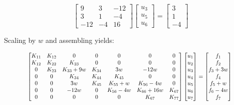 \begin{equation}
    \begin{bmatrix}
        9 & 3 & -12 \\
        3 & 1 & -4 \\
        -12 & -4 & 16
    \end{bmatrix}
    \begin{bmatrix}
        u_3 \\
        u_5 \\
        u_6
    \end{bmatrix}
    = \begin{bmatrix}
        3 \\
        1 \\
        -4
    \end{bmatrix}
\end{equation}

Scaling by $ w $ and assembling yields:

\begin{equation}
    \resizebox{0.85\hsize}{!}{%
        $\begin{bmatrix}
            K_{11} & K_{12} & 0 & 0 & 0 & 0 & 0 \\
            K_{12} & K_{22} & K_{23} & 0 & 0 & 0 & 0 \\
            0 & K_{23} & K_{33} + 9 w & K_{34} & 3w & -12w & 0 \\
            0 & 0 & K_{34} & K_{44} & K_{45} & 0 & 0 \\
            0 & 0 & 3w & K_{45} & K_{55} + w & K_{56} - 4w & 0 \\
            0 & 0 & -12w & 0 & K_{56} - 4w & K_{66} + 16w & K_{67} \\
            0 & 0 & 0 & 0 & 0 & K_{67} & K_{77}
        \end{bmatrix}
        \begin{bmatrix}
            u_1 \\
            u_2 \\
            u_3 \\
            u_4 \\
            u_5 \\
            u_6 \\
            u_7
        \end{bmatrix}
        = \begin{bmatrix}
            f_1 \\
            f_2 \\
            f_3 + 3 w \\
            f_4 \\
            f_5 + w \\
            f_6 - 4 w \\
            f_7
        \end{bmatrix}$
    }
\end{equation}


